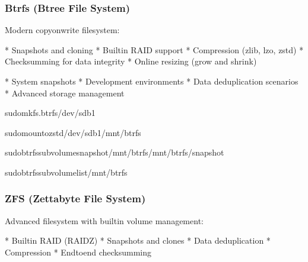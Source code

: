 \documentclass[letterpaper,10pt,english]{sphinxmanual}
\begin{document}
\subsubsection{Btrfs (B\sphinxhyphen{}tree File System)}
\label{\detokenize{file-systems:btrfs-b-tree-file-system}}
\sphinxAtStartPar
Modern copy\sphinxhyphen{}on\sphinxhyphen{}write filesystem:

\sphinxAtStartPar
{}
* Snapshots and cloning
* Built\sphinxhyphen{}in RAID support
* Compression (zlib, lzo, zstd)
* Checksumming for data integrity
* Online resizing (grow and shrink)

\sphinxAtStartPar
{}
* System snapshots
* Development environments
* Data deduplication scenarios
* Advanced storage management

\begin{sphinxVerbatim}[commandchars=\\\{\}]
sudomkfs.btrfs/dev/sdb1

sudomount\PYGZhy{}ozstd/dev/sdb1/mnt/btrfs

sudobtrfssubvolumesnapshot/mnt/btrfs/mnt/btrfs/snapshot

sudobtrfssubvolumelist/mnt/btrfs
\end{sphinxVerbatim}


\subsubsection{ZFS (Zettabyte File System)}
\label{\detokenize{file-systems:zfs-zettabyte-file-system}}
\sphinxAtStartPar
Advanced filesystem with built\sphinxhyphen{}in volume management:

\sphinxAtStartPar
{}
* Built\sphinxhyphen{}in RAID (RAID\sphinxhyphen{}Z)
* Snapshots and clones
* Data deduplication
* Compression
* End\sphinxhyphen{}to\sphinxhyphen{}end checksumming

\sphinxAtStartPar
{}
\end{document}
